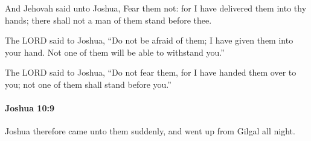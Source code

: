 			\begin{versebox}
					\item[BHS] 
					\item[ASV] And Jehovah said unto Joshua, Fear them not: for I have delivered them into thy hands; there shall not a man of them stand before thee.
					\item[NIV] The LORD said to Joshua, “Do not be afraid of them; I have given them into your hand. Not one of them will be able to withstand you.”
					\item[NRSV] The LORD said to Joshua, “Do not fear them, for I have handed them over to you; not one of them shall stand before you.”
			\end{versebox}

		\paragraph{Joshua 10:9} %
			\label{JOSHUA-10-9}

			Joshua therefore came unto them suddenly, and went up from Gilgal all night.

